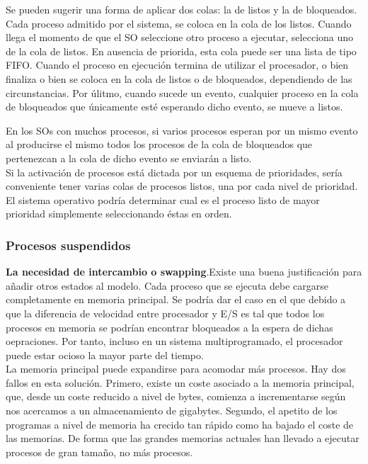 \documentclass{article}
\begin{document}
				Se pueden sugerir una forma de aplicar dos colas: la de listos y la de bloqueados. Cada proceso admitido por el sistema, se coloca en la cola de los listos. Cuando llega el momento de que el SO seleccione otro proceso a ejecutar, selecciona uno de la cola de listos. En ausencia de priorida, esta cola puede ser una lista de tipo FIFO. Cuando el proceso en ejecución termina de utilizar el procesador, o bien finaliza o bien se coloca en la cola de listos o de bloqueados, dependiendo de las circunstancias. Por úlitmo, cuando sucede un evento, cualquier proceso en la cola de bloqueados que únicamente esté esperando dicho evento, se mueve a listos.
				
				En los SOs con muchos procesos, si varios procesos esperan por un mismo evento al producirse el mismo todos los procesos de la cola de bloqueados que pertenezcan a la cola de dicho evento se enviarán a listo. \\
				Si la activación de procesos está dictada por un esquema de prioridades, sería conveniente tener varias colas de procesos listos, una por cada nivel de prioridad. El sistema operativo podría determinar cual es el proceso listo de mayor prioridad simplemente seleccionando éstas en orden.
			\subsubsection{Procesos suspendidos}
				\textbf{La necesidad de intercambio o swapping}.Existe una buena justificación para añadir otros estados al modelo. Cada proceso que se ejecuta debe cargarse completamente en memoria principal. Se podría dar el caso en el que debido a que la diferencia de velocidad entre procesador y E/S es tal que todos los procesos en memoria se podrían encontrar bloqueados a la espera de dichas oepraciones. Por tanto, incluso en un sistema multiprogramado, el procesador puede estar ocioso la mayor parte del tiempo. \\
				
				La memoria principal puede expandirse para acomodar más procesos. Hay dos fallos en esta solución. Primero, existe un coste asociado a la memoria principal, que, desde un coste reducido a nivel de bytes, comienza a incrementarse según nos acercamos a un almacenamiento de gigabytes. Segundo, el apetito de los programas a nivel de memoria ha crecido tan rápido como ha bajado el coste de las memorias. De forma que las grandes memorias actuales han llevado a ejecutar procesos de gran tamaño, no más procesos. \\
				
\end{document}
